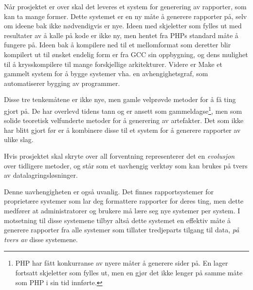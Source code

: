 \documentclass[11pt]{article}
\begin{document}
Når prosjektet er over skal det leveres et system for generering av rapporter, som kan ta mange former.
Dette systemet er en ny måte å generere rapporter på, selv om ideene bak ikke nødvendigvis er nye.
Ideen med skjeletter som fylles ut med resultater av å kalle på kode er ikke ny,
men hentet fra PHPs standard måte å fungere på.
Ideen bak å kompilere ned til et mellomformat som deretter blir kompilert ut til ønsket endelig form
er fra GCC sin oppbygning, og dens mulighet til å krysskompilere til mange forskjellige arkitekturer.
Videre er Make et gammelt system for å bygge systemer vha. en avhengighetsgraf,
som automatiserer bygging av programmer.

Disse tre tenkemåtene er ikke nye, men gamle velprøvde metoder for å få ting gjort på.
De har overlevd tidens tann og er ansett som gammeldagse\footnote{PHP har fått konkurranse av nyere måter å generere sider på. En lager fortsatt skjeletter som fylles ut, men en gjør det ikke lenger på samme måte som PHP i sin tid innførte.},
men som solide teoretisk velfunderte metoder for å generering av artefakter.
Det som ikke har blitt gjort før er å kombinere disse til et system for å generere rapporter av ulike slag.

Hvis prosjektet skal skryte over all forventning representerer det en \emph{evolusjon} over tidligere
metoder, og står som et uavhengig verktøy som kan brukes på tvers av datalagringsløsninger.

Denne uavhengigheten er også uvanlig.
Det finnes rapportsystemer for  proprietære systemer som lar deg formattere rapporter for deres ting,
men dette medfører at administratorer og brukere må lære seg nye systemer per system.
I motsetning til disse systemene tilbyr altså dette systemet en effektiv måte å generere rapporter fra
alle systemer som tillater tredjeparts tilgang til data, \emph{på tvers av} disse systemene.
\end{document}
